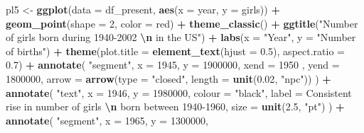\documentclass[11pt,a4paper,]{article}
\newenvironment{Shaded}{\begin{snugshade}}{\end{snugshade}}
\newcommand{\AttributeTok}[1]{\textcolor[rgb]{0.13,0.29,0.53}{#1}}
\newcommand{\DecValTok}[1]{\textcolor[rgb]{0.00,0.00,0.81}{#1}}
\newcommand{\FloatTok}[1]{\textcolor[rgb]{0.00,0.00,0.81}{#1}}
\newcommand{\FunctionTok}[1]{\textcolor[rgb]{0.13,0.29,0.53}{\textbf{#1}}}
\newcommand{\NormalTok}[1]{#1}
\newcommand{\OtherTok}[1]{\textcolor[rgb]{0.56,0.35,0.01}{#1}}
\newcommand{\SpecialCharTok}[1]{\textcolor[rgb]{0.81,0.36,0.00}{\textbf{#1}}}
\newcommand{\StringTok}[1]{\textcolor[rgb]{0.31,0.60,0.02}{#1}}
\begin{document}
\begin{Shaded}
\begin{Highlighting}[]
\NormalTok{pl5 }\OtherTok{\textless{}{-}} \FunctionTok{ggplot}\NormalTok{(}\AttributeTok{data =}\NormalTok{ df\_present, }\FunctionTok{aes}\NormalTok{(}\AttributeTok{x =}\NormalTok{ year, }\AttributeTok{y =}\NormalTok{ girls)) }\SpecialCharTok{+}
  \FunctionTok{geom\_point}\NormalTok{(}\AttributeTok{shape =} \DecValTok{2}\NormalTok{, }\AttributeTok{color =} \StringTok{\textquotesingle{}red\textquotesingle{}}\NormalTok{) }\SpecialCharTok{+} \FunctionTok{theme\_classic}\NormalTok{() }\SpecialCharTok{+} 
  \FunctionTok{ggtitle}\NormalTok{(}\StringTok{"Number of girls born during 1940{-}2002 }\SpecialCharTok{\textbackslash{}n}\StringTok{ in the US"}\NormalTok{) }\SpecialCharTok{+}
   \FunctionTok{labs}\NormalTok{(}\AttributeTok{x =} \StringTok{"Year"}\NormalTok{, }\AttributeTok{y =} \StringTok{"Number of births"}\NormalTok{) }\SpecialCharTok{+} \FunctionTok{theme}\NormalTok{(}\AttributeTok{plot.title =} \FunctionTok{element\_text}\NormalTok{(}\AttributeTok{hjust =} \FloatTok{0.5}\NormalTok{), }
                                                    \AttributeTok{aspect.ratio =} \FloatTok{0.7}\NormalTok{) }\SpecialCharTok{+}
  \FunctionTok{annotate}\NormalTok{(}
    \StringTok{"segment"}\NormalTok{,}
    \AttributeTok{x =} \DecValTok{1945}\NormalTok{,}
    \AttributeTok{y =} \DecValTok{1900000}\NormalTok{,}
    \AttributeTok{xend =} \DecValTok{1950}\NormalTok{  ,}
    \AttributeTok{yend =} \DecValTok{1800000}\NormalTok{,}
    \AttributeTok{arrow =} \FunctionTok{arrow}\NormalTok{(}\AttributeTok{type =} \StringTok{"closed"}\NormalTok{,}
                  \AttributeTok{length =} \FunctionTok{unit}\NormalTok{(}\FloatTok{0.02}\NormalTok{, }\StringTok{"npc"}\NormalTok{))}
\NormalTok{  ) }\SpecialCharTok{+}
  \FunctionTok{annotate}\NormalTok{(}
    \StringTok{"text"}\NormalTok{,}
    \AttributeTok{x =} \DecValTok{1946}\NormalTok{,}
    \AttributeTok{y =} \DecValTok{1980000}\NormalTok{,}
    \AttributeTok{colour =} \StringTok{"black"}\NormalTok{,}
    \AttributeTok{label =} \StringTok{\textquotesingle{}Consistent rise in number of girls }\SpecialCharTok{\textbackslash{}n}\StringTok{ born between 1940{-}1960\textquotesingle{}}\NormalTok{,}
    \AttributeTok{size =} \FunctionTok{unit}\NormalTok{(}\FloatTok{2.5}\NormalTok{, }\StringTok{"pt"}\NormalTok{)}
\NormalTok{  ) }\SpecialCharTok{+}
  \FunctionTok{annotate}\NormalTok{(}
    \StringTok{"segment"}\NormalTok{,}
    \AttributeTok{x =} \DecValTok{1965}\NormalTok{,}
    \AttributeTok{y =} \DecValTok{1300000}\NormalTok{,}

\end{Highlighting}
\end{Shaded}
\end{document}
